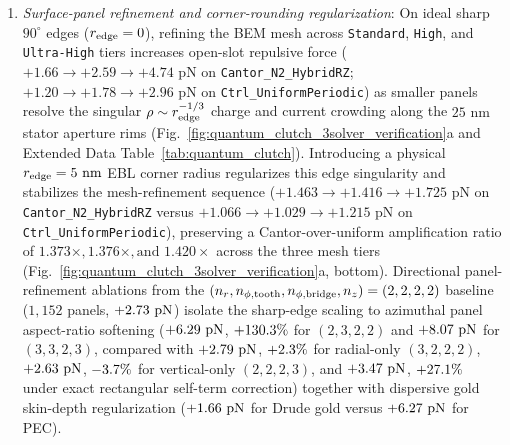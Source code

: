 \documentclass[pdflatex,sn-nature]{sn-jnl}
\DeclareRobustCommand{\roundtwo}[1]{\fpeval{round(#1,2)}}
\begin{document}
\begin{enumerate}
    \item \emph{Surface-panel refinement and corner-rounding regularization}: On ideal sharp $90^\circ$ edges ($r_{\rm edge} = 0$), refining the BEM mesh across \texttt{Standard}, \texttt{High}, and \texttt{Ultra-High} tiers increases open-slot repulsive force ($+1.66 \to +2.59 \to +4.74\text{ pN}$ on \texttt{Cantor\_N2\_HybridRZ}; $+1.20 \to +1.78 \to +2.96\text{ pN}$ on \texttt{Ctrl\_UniformPeriodic}) as smaller panels resolve the singular $\rho \sim r_{\rm edge}^{-1/3}$ charge and current crowding along the $25\text{ nm}$ stator aperture rims (Fig.~\ref{fig:quantum_clutch_3solver_verification}a and Extended Data Table~\ref{tab:quantum_clutch}). Introducing a physical $r_{\rm edge} = 5\text{ nm}$ EBL corner radius regularizes this edge singularity and stabilizes the mesh-refinement sequence ($+1.463 \to +1.416 \to +1.725\text{ pN}$ on \texttt{Cantor\_N2\_HybridRZ} versus $+1.066 \to +1.029 \to +1.215\text{ pN}$ on \texttt{Ctrl\_UniformPeriodic}), preserving a Cantor-over-uniform amplification ratio of $1.373\times, 1.376\times, \text{and } 1.420\times$ across the three mesh tiers (Fig.~\ref{fig:quantum_clutch_3solver_verification}a, bottom). Directional panel-refinement ablations from the $(n_r, n_{\phi,\rm tooth}, n_{\phi,\rm bridge}, n_z) = (2,2,2,2)$ baseline ($1{,}152$ panels, $+\roundtwo{\BemConvDirBaseFzPn}\text{ pN}$) isolate the sharp-edge scaling to azimuthal panel aspect-ratio softening ($+\roundtwo{\BemConvDirAzimuthalFzPn}\text{ pN}$, $+130.3{}\%$ for $(2,3,2,2)$ and $+\roundtwo{\BemConvDirHighFzPn}\text{ pN}$ for $(3,3,2,3)$, compared with $+\roundtwo{\BemConvDirRadialFzPn}\text{ pN}$, $+2.3{}\%$ for radial-only $(3,2,2,2)$, $+\roundtwo{\BemConvDirVerticalFzPn}\text{ pN}$, $-3.7{}\%$ for vertical-only $(2,2,2,3)$, and $+\roundtwo{\BemConvDirRectSelfFzPn}\text{ pN}$, $+27.1{}\%$ under exact rectangular self-term correction) together with dispersive gold skin-depth regularization ($+\roundtwo{\CantorNtwoHybridrzBemStdFZPn}\text{ pN}$ for Drude gold versus $+\roundtwo{\BemConvStdNxitwofourPecFzPn}\text{ pN}$ for PEC).

\end{enumerate}
\end{document}
